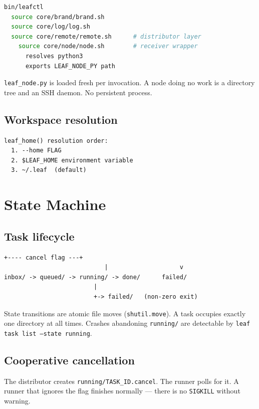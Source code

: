 \documentclass[11pt,a4paper]{article}
\begin{document}
\begin{lstlisting}[language=bash]
bin/leafctl
  source core/brand/brand.sh
  source core/log/log.sh
  source core/remote/remote.sh      # distributor layer
	source core/node/node.sh        # receiver wrapper
	  resolves python3
	  exports LEAF_NODE_PY path
\end{lstlisting}

\texttt{leaf\_node.py} is loaded fresh per invocation. A node doing no work is
a directory tree and an SSH daemon. No persistent process.

\subsection{Workspace resolution}

\begin{lstlisting}[language={}]
leaf_home() resolution order:
  1. --home FLAG
  2. $LEAF_HOME environment variable
  3. ~/.leaf  (default)
\end{lstlisting}

\section{State Machine}

\subsection{Task lifecycle}

\begin{lstlisting}[language={}]
							+---- cancel flag ---+
							|                    v
inbox/ -> queued/ -> running/ -> done/      failed/
						 |
						 +-> failed/   (non-zero exit)
\end{lstlisting}

State transitions are atomic file moves (\texttt{shutil.move}). A task occupies
exactly one directory at all times. Crashes abandoning \texttt{running/} are
detectable by \texttt{leaf task list --state running}.

\subsection{Cooperative cancellation}

The distributor creates \texttt{running/TASK\_ID.cancel}. The runner polls for
it. A runner that ignores the flag finishes normally --- there is no
\texttt{SIGKILL} without warning.
\end{document}
